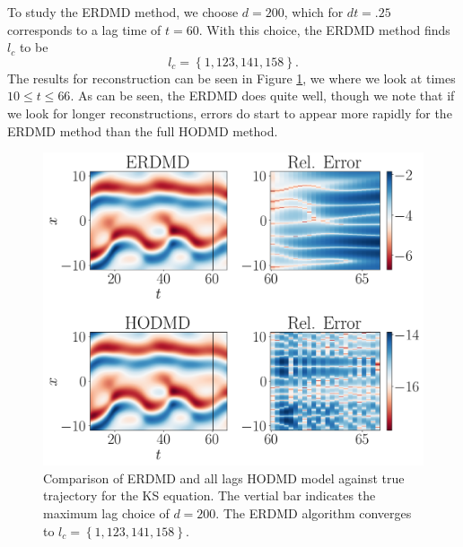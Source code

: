 \documentclass[a4paper,11pt]{article}
\begin{document}
To study the ERDMD method, we choose $d=200$, which for $dt=.25$ corresponds to a lag time of $t=60$.  With this choice, the ERDMD method finds $l_{c}$ to be 
\[
l_{c}=\left\{1, 123, 141, 158\right\}.
\]
The results for reconstruction can be seen in Figure \ref{fig:ks_compare_d_200}, we where we look at times $10\leq t \leq 66$.  As can be seen, the ERDMD does quite well, though we note that if we look for longer reconstructions, errors do start to appear more rapidly for the ERDMD method than the full HODMD method.  
\begin{figure}[!h]
\centering
\includegraphics[width=1\textwidth]{ks_dynamics_compare}
\caption{Comparison of ERDMD and all lags HODMD model against true trajectory for the KS equation.  The vertial bar indicates the maximum lag choice of $d=200$. The ERDMD algorithm converges to $l_{c}=\left\{1, 123, 141, 158\right\}$.}
\label{fig:ks_compare_d_200}
\end{figure} 
 
\end{document}
